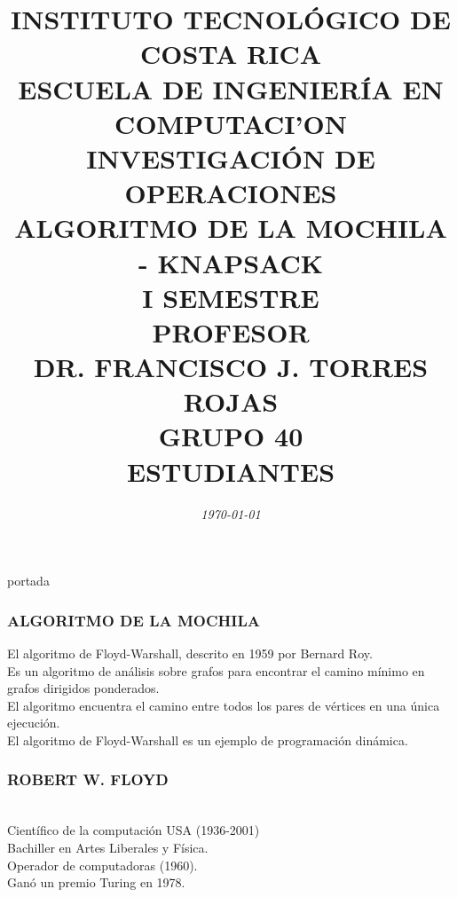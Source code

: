 \documentclass[10]{beamer}
\title{{\color{WHITE} \large \textbf{INSTITUTO TECNOL\'OGICO DE COSTA RICA}} \\ \vspace{0.02cm} 
{\color{WHITE} \large \textbf{ESCUELA DE INGENIER\'IA EN COMPUTACI'ON }} \\ \vspace{0.02cm} 
{\color{WHITE} \large \textbf{INVESTIGACI\'ON DE OPERACIONES  }} \\ \vspace{0.02cm} 
{\color{WHITE} \large \textbf{ALGORITMO DE LA MOCHILA - KNAPSACK  }} \\ \vspace{0.02cm} 
{\color{WHITE} \large \textbf{I SEMESTRE  }}\\ \vspace{0.02cm}
{\color{WHITE} \large \textbf{PROFESOR}} \\ \vspace{0.02cm}
{\color{WHITE} \large DR. FRANCISCO J. TORRES ROJAS  } \\ \vspace{0.02cm}
{\color{WHITE} \large \textbf{GRUPO 40}} \\ \vspace{0.01cm}
{\color{WHITE} \large \textbf{ESTUDIANTES} }}
\date{\em \color{WHITE} \today}
\begin{document}
\begin{frame}
\color{white}
\titlepage portada
\end{frame} 
\begin{frame}
\color{white}
\frametitle{ALGORITMO DE LA MOCHILA}
El algoritmo de Floyd-Warshall, descrito en 1959 por Bernard Roy.
\\Es un algoritmo de análisis sobre grafos para encontrar el camino mínimo en grafos dirigidos ponderados.
\\El algoritmo encuentra el camino entre todos los pares de vértices en una única ejecución.
\\ El algoritmo de Floyd-Warshall es un ejemplo de programación dinámica.
\end{frame} 
\begin{frame}
\color{white}
\frametitle{ROBERT W. FLOYD}
\\Cient\'ifico de la computaci\'on USA (1936-2001)\\
Bachiller en Artes Liberales y F\'isica. \\ Operador de computadoras (1960). \\ Gan\'o un premio Turing en 1978.
\end{frame} 
\end{document}
